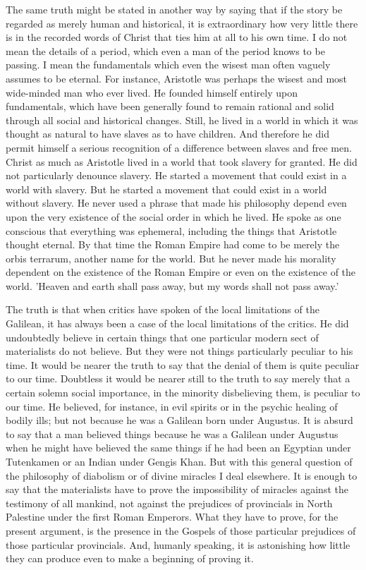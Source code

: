 The same truth might be stated in another way by saying that if the story be regarded as merely human and historical, it is extraordinary how very little there is in the recorded words of Christ that ties him at all to his own time. I do not mean the details of a period, which even a man of the period knows to be passing. I mean the fundamentals which even the wisest man often vaguely assumes to be eternal. For instance, Aristotle was perhaps the wisest and most wide-minded man who ever lived. He founded himself entirely upon fundamentals, which have been generally found to remain rational and solid through all social and historical changes. Still, he lived in a world in which it was thought as natural to have slaves as to have children. And therefore he did permit himself a serious recognition of a difference between slaves and free men. Christ as much as Aristotle lived in a world that took slavery for granted. He did not particularly denounce slavery. He started a movement that could exist in a world with slavery. But he started a movement that could exist in a world without slavery. He never used a phrase that made his philosophy depend even upon the very existence of the social order in which he lived. He spoke as one conscious that everything was ephemeral, including the things that Aristotle thought eternal. By that time the Roman Empire had come to be merely the orbis terrarum, another name for the world. But he never made his morality dependent on the existence of the Roman Empire or even on the existence of the world. 'Heaven and earth shall pass away, but my words shall not pass away.'

The truth is that when critics have spoken of the local limitations of the Galilean, it has always been a case of the local limitations of the critics. He did undoubtedly believe in certain things that one particular modern sect of materialists do not believe. But they were not things particularly peculiar to his time. It would be nearer the truth to say that the denial of them is quite peculiar to our time. Doubtless it would be nearer still to the truth to say merely that a certain solemn social importance, in the minority disbelieving them, is peculiar to our time. He believed, for instance, in evil spirits or in the psychic healing of bodily ills; but not because he was a Galilean born under Augustus. It is absurd to say that a man believed things because he was a Galilean under Augustus when he might have believed the same things if he had been an Egyptian under Tutenkamen or an Indian under Gengis Khan. But with this general question of the philosophy of diabolism or of divine miracles I deal elsewhere. It is enough to say that the materialists have to prove the impossibility of miracles against the testimony of all mankind, not against the prejudices of provincials in North Palestine under the first Roman Emperors. What they have to prove, for the present argument, is the presence in the Gospels of those particular prejudices of those particular provincials. And, humanly speaking, it is astonishing how little they can produce even to make a beginning of proving it.

